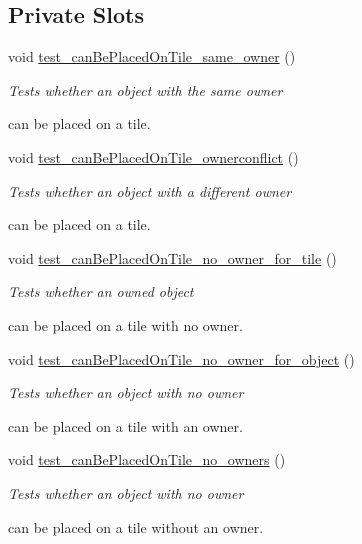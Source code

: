 \subsection*{Private Slots}
\begin{DoxyCompactItemize}
\item 
void \hyperlink{classdefault__building_a6012517a2cdabf2eafc45fe58c1c00c8}{test\-\_\-can\-Be\-Placed\-On\-Tile\-\_\-same\-\_\-owner} ()
\begin{DoxyCompactList}\small\item\em Tests whether an object with the same owner \par
 can be placed on a tile. \end{DoxyCompactList}\item 
void \hyperlink{classdefault__building_ae581115cf5ef510cd11c9ca627cc2520}{test\-\_\-can\-Be\-Placed\-On\-Tile\-\_\-ownerconflict} ()
\begin{DoxyCompactList}\small\item\em Tests whether an object with a different owner \par
 can be placed on a tile. \end{DoxyCompactList}\item 
void \hyperlink{classdefault__building_a1ec8a3bb7a692d66acf8d0b75cd3ba44}{test\-\_\-can\-Be\-Placed\-On\-Tile\-\_\-no\-\_\-owner\-\_\-for\-\_\-tile} ()
\begin{DoxyCompactList}\small\item\em Tests whether an owned object \par
 can be placed on a tile with no owner. \end{DoxyCompactList}\item 
void \hyperlink{classdefault__building_aa27f2bdc2cf8f1c1af513638c6ad392b}{test\-\_\-can\-Be\-Placed\-On\-Tile\-\_\-no\-\_\-owner\-\_\-for\-\_\-object} ()
\begin{DoxyCompactList}\small\item\em Tests whether an object with no owner \par
 can be placed on a tile with an owner. \end{DoxyCompactList}\item 
void \hyperlink{classdefault__building_a949f126050554047ff7e3192e1af3d75}{test\-\_\-can\-Be\-Placed\-On\-Tile\-\_\-no\-\_\-owners} ()
\begin{DoxyCompactList}\small\item\em Tests whether an object with no owner \par
 can be placed on a tile without an owner. \end{DoxyCompactList}\item 

\end{DoxyCompactItemize}
